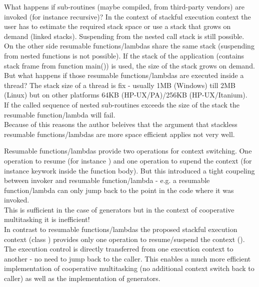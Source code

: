 What happens if sub-routines (maybe compiled, from third-party vendors) are
invoked (for instance recursive)? In the context of stackful execution context
the user has to estimate the required stack space or use a stack that grows on
demand (linked stacks). Suspending from the nested call stack is still
possible.\\
On the other side resumable functions/lambdas share the same stack (suspending
from nested functions is not possible). If the stack of the application
(contains stack frame from function main()) is used, the size of the stack grows
on demand. But what happens if those resumable functions/lambdas are executed
inside a thread? The stack size of a thread is fix - usually 1MB (Windows) till
2MB (Linux) but on other platforms 64KB (HP-UX/PA)/256KB (HP-UX/Itanium).\\
If the called sequence of nested sub-routines exceeds the size of the stack the
resumable function/lambda will fail.\\
\newline
Because of this reasons the author beleives that the argument that stackless
resumable functions/lambdas are more space efficient applies not very well.

Resumable functions/lambdas provide two operations for context switching. One
operation to resume (for instance \rlop) and one
operation to supend the context (for instance keywork \yield inside the function
body). But this introduced a tight coupeling between invoker and resumable
function/lambda - e.g. a resumable function/lambda can only jump back to the
point in the code where it was invoked.\\
This is sufficient in the case of generators but in the context of cooperative
multitasking it is inefficient!\\
In contrast to resumable functions/lambdas the proposed stackful execution
context (class \ectx) provides only one operation to resume/suspend
the context (\ectxop). The execution control is directly transferred from one
execution context to another - no need to jump back to the caller. This enables
a much more efficient implementation of cooperative multitasking (no additional
context switch back to caller) as well as the implementation of generators.


